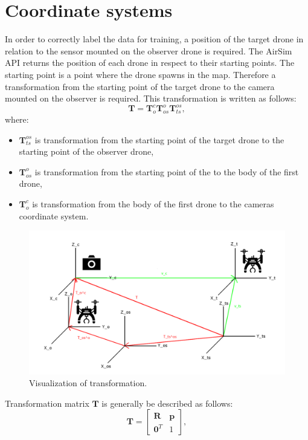 \documentclass[twoside]{ctuthesis}
\theoremstyle{plain}
\theoremstyle{definition}
\theoremstyle{note}
\begin{document}
\section{Coordinate systems}
In order to correctly label the data for training, a position of the target drone in relation to the sensor mounted on the observer drone is required. The AirSim API returns the position of each drone in respect to their starting points. The starting point is a point where the drone spawns in the map. Therefore a transformation from the starting point of the target drone to the camera mounted on the observer is required. This transformation is written as follows:
\begin{equation}
	\textbf{T}=\textbf{T}_{o}^{c}\textbf{T}_{os}^{o}\textbf{T}_{ts}^{os},
\end{equation}
where:
\begin{itemize}
	\item $\textbf{T}_{ts}^{os}$ is transformation from the starting point of the target drone to the starting point of the observer drone,
	\item $\textbf{T}_{os}^{o}$ is transformation from the starting point of the  to the body of the first drone,
	\item $\textbf{T}_{o}^{c}$ is transformation from the body of the first drone to the cameras coordinate system.
\end{itemize}
\begin{figure}
	\centering
	\includegraphics[width=\textwidth]{coord_schema.png}
	\caption{Visualization of transformation.}
	\label{fig:trans}
\end{figure}
Transformation matrix $\textbf{T}$ is generally be described as follows:
\begin{equation}
	\textbf{T}=\begin{bmatrix}
		\textbf{R} & \textbf{p}\\
		\textbf{0}^T & 1
	\end{bmatrix},
\end{equation}
\end{document}
